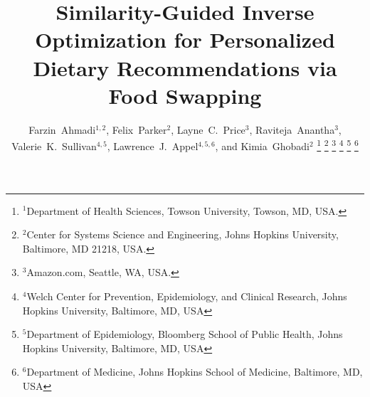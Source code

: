 \documentclass[journal]{IEEEtran}
\begin{document}
\title{Similarity-Guided Inverse Optimization for Personalized\\
Dietary Recommendations via Food Swapping}

\author{%
  Farzin~Ahmadi$^{1,2}$,
  Felix~Parker$^{2}$,
  Layne~C.~Price$^{3}$,
  Raviteja~Anantha$^{3}$,
  Valerie~K.~Sullivan$^{4,5}$,
  Lawrence~J.~Appel$^{4,5,6}$,
  and Kimia~Ghobadi$^{2}$%
  \thanks{$^{1}$Department of Health Sciences, Towson University, Towson, MD, USA.}%
  \thanks{$^{2}$Center for Systems Science and Engineering,
    Johns Hopkins University, Baltimore, MD 21218, USA.}%
  \thanks{$^{3}$Amazon.com, Seattle, WA, USA.}%
  \thanks{$^{4}$Welch Center for Prevention, Epidemiology, and Clinical Research, Johns Hopkins University, Baltimore, MD, USA}%
  \thanks{$^{5}$Department of Epidemiology, Bloomberg School of Public Health, Johns Hopkins University, Baltimore, MD, USA}%
  \thanks{$^{6}$Department of Medicine, Johns Hopkins School of Medicine, Baltimore, MD, USA}%
}

\maketitle
\end{document}

